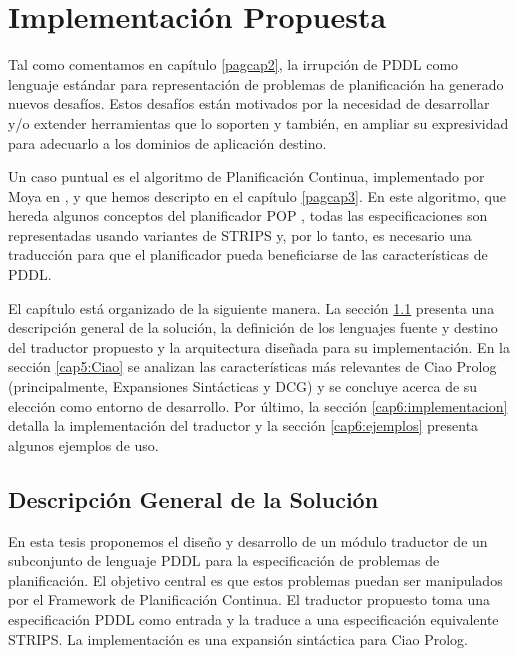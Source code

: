 
\chapter{Implementaci\'on Propuesta} \label{pagcap6}


Tal como comentamos en cap\'itulo \ref{pagcap2}, la irrupci\'on de
PDDL como lenguaje est\'andar para representaci\'on de problemas de
planificaci\'on ha generado nuevos desaf\'ios. Estos desaf\'ios est\'an
motivados por la necesidad de desarrollar y/o extender herramientas que
lo soporten y tambi\'en, en ampliar su expresividad para adecuarlo a
los dominios de aplicaci\'on destino. 

Un caso puntual es el algoritmo de Planificaci\'on Continua, 
implementado por Moya en \cite{gbraun:tesisMarioMoya}, y que hemos descripto en el
cap\'itulo \ref{pagcap3}. 
En este algoritmo, que hereda algunos conceptos del pla\-ni\-fi\-ca\-dor 
POP \cite{gbraun:pop:1991}, todas las especificaciones son 
representadas usando variantes de STRIPS y, por lo tanto, es necesario
una traducci\'on para que el planificador pueda beneficiarse de las
caracter\'isticas de PDDL.

El cap\'itulo est\'a organizado de la siguiente manera. 
La secci\'on \ref{cap5:descripcionGen} presenta una descripci\'on
general de la soluci\'on, la definici\'on de los lenguajes fuente y destino
del traductor propuesto y la arquitectura dise\~{n}ada para 
su implementaci\'on. En la secci\'on \ref{cap5:Ciao}
se analizan las caracter\'isticas m\'as relevantes de Ciao Prolog
(principalmente, Expansiones Sint\'acticas y DCG) y 
se concluye acerca de su elecci\'on como entorno de 
desarrollo. Por \'ultimo, la secci\'on \ref{cap6:implementacion} detalla la implementaci\'on
del traductor y la secci\'on \ref{cap6:ejemplos} presenta algunos ejemplos de uso.


\section{Descripci\'on General de la Soluci\'on} \label{cap5:descripcionGen}

	En esta tesis proponemos el dise\~{n}o y desarrollo de un m\'odulo traductor de un 
	subconjunto de lenguaje PDDL para la especificaci\'on de
        problemas de planificaci\'on. El objetivo central es que estos
        problemas puedan ser manipulados por el Framework de Planificaci\'on Continua. 
        El traductor propuesto toma una especificaci\'on PDDL como entrada 
	y la traduce a una especificaci\'on equivalente STRIPS. La
	implementaci\'on es una expansi\'on sint\'actica para Ciao
        Prolog.

